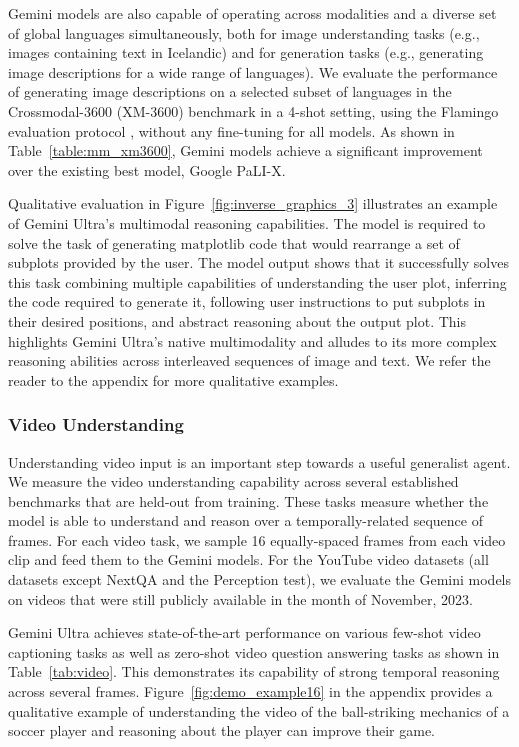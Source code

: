 Gemini models are also capable of operating across modalities and a diverse set of global languages simultaneously, both for image understanding tasks (e.g., images containing text in Icelandic) and for generation tasks (e.g., generating image descriptions for a wide range of languages). We evaluate the performance of generating image descriptions on a selected subset of languages in the Crossmodal-3600 (XM-3600) benchmark in a 4-shot setting, using the Flamingo evaluation protocol \cite{flamingo}, without any fine-tuning for all models. As shown in Table~\ref{table:mm_xm3600}, Gemini models achieve a significant improvement over the existing best model, Google PaLI-X.

Qualitative evaluation in Figure~\ref{fig:inverse_graphics_3} illustrates an example of Gemini Ultra's multimodal reasoning capabilities. The model is required to solve the task of generating $\textrm{matplotlib}$ code that would rearrange a set of subplots provided by the user. The model output shows that it successfully solves this task combining multiple capabilities of understanding the user plot, inferring the code required to generate it, following user instructions to put subplots in their desired positions, and abstract reasoning about the output plot. This highlights Gemini Ultra's native multimodality and alludes to its more complex reasoning abilities across interleaved sequences of image and text. We refer the reader to the appendix for more qualitative examples.

\subsubsection{Video Understanding}
\label{sec:video}
Understanding video input is an important step towards a useful generalist agent. We measure the video understanding capability across several established benchmarks that are held-out from training. These tasks measure whether the model is able to understand and reason over a temporally-related sequence of frames. For each video task, we sample 16 equally-spaced frames from each video clip and feed them to the Gemini models. For the YouTube video datasets (all datasets except NextQA and the Perception test), we evaluate the Gemini models on videos that were still publicly available in the month of November, 2023. 

Gemini Ultra achieves state-of-the-art performance on various few-shot video captioning tasks as well as zero-shot video question answering tasks as shown in Table~\ref{tab:video}. This demonstrates its capability of strong temporal reasoning across several frames. Figure~\ref{fig:demo_example16} in the appendix provides a qualitative example of understanding the video of the ball-striking mechanics of a soccer player and reasoning about the player can improve their game.

